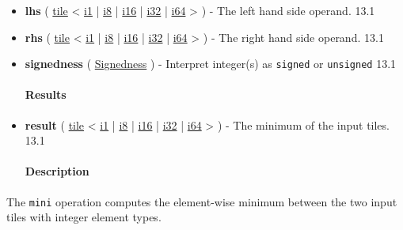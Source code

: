 \documentclass{article}
\begin{document}
\begin{itemize}
\item \textbf{lhs} ( \href{https://docs.nvidia.com/cuda/tile-ir/latest/sections/types.html#type-tile}{tile} < \href{https://docs.nvidia.com/cuda/tile-ir/latest/sections/types.html#subsection-element-types}{i1} | \href{https://docs.nvidia.com/cuda/tile-ir/latest/sections/types.html#subsection-element-types}{i8} | \href{https://docs.nvidia.com/cuda/tile-ir/latest/sections/types.html#subsection-element-types}{i16} | \href{https://docs.nvidia.com/cuda/tile-ir/latest/sections/types.html#subsection-element-types}{i32} | \href{https://docs.nvidia.com/cuda/tile-ir/latest/sections/types.html#subsection-element-types}{i64} > ) - The left hand side operand. 13.1
\item \textbf{rhs} ( \href{https://docs.nvidia.com/cuda/tile-ir/latest/sections/types.html#type-tile}{tile} < \href{https://docs.nvidia.com/cuda/tile-ir/latest/sections/types.html#subsection-element-types}{i1} | \href{https://docs.nvidia.com/cuda/tile-ir/latest/sections/types.html#subsection-element-types}{i8} | \href{https://docs.nvidia.com/cuda/tile-ir/latest/sections/types.html#subsection-element-types}{i16} | \href{https://docs.nvidia.com/cuda/tile-ir/latest/sections/types.html#subsection-element-types}{i32} | \href{https://docs.nvidia.com/cuda/tile-ir/latest/sections/types.html#subsection-element-types}{i64} > ) - The right hand side operand. 13.1
\item \textbf{signedness} ( \href{https://docs.nvidia.com/cuda/tile-ir/latest/sections/operations.html#op-attribute-cuda-tile-mini-signedness-attr}{Signedness} ) - Interpret integer(s) as \texttt{signed} or \texttt{unsigned} 13.1


\paragraph{Results}

\item \textbf{result} ( \href{https://docs.nvidia.com/cuda/tile-ir/latest/sections/types.html#type-tile}{tile} < \href{https://docs.nvidia.com/cuda/tile-ir/latest/sections/types.html#subsection-element-types}{i1} | \href{https://docs.nvidia.com/cuda/tile-ir/latest/sections/types.html#subsection-element-types}{i8} | \href{https://docs.nvidia.com/cuda/tile-ir/latest/sections/types.html#subsection-element-types}{i16} | \href{https://docs.nvidia.com/cuda/tile-ir/latest/sections/types.html#subsection-element-types}{i32} | \href{https://docs.nvidia.com/cuda/tile-ir/latest/sections/types.html#subsection-element-types}{i64} > ) - The minimum of the input tiles. 13.1


\paragraph{Description}

\end{itemize}
The \texttt{mini} operation computes the element-wise minimum between the two input tiles with integer element types.
\end{document}
